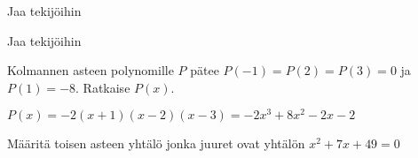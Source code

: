 \begin{tehtavasivu}
\begin{tehtava}
Jaa tekijöihin
\begin{alakohdat}
\end{alakohdat}
\begin{vastaus}
\begin{alakohdat}
\end{alakohdat}
\end{vastaus}
\end{tehtava}

\begin{tehtava}
    Jaa tekijöihin
    \begin{alakohdat}
    \end{alakohdat}
    \begin{vastaus}
    	\begin{alakohdat}
        \end{alakohdat}
    \end{vastaus}
\end{tehtava}

\begin{tehtava}
    Kolmannen asteen polynomille $P$ pätee $P(-1)=P(2)=P(3)=0$ ja $P(1)=-8$. Ratkaise $P(x)$.
    \begin{vastaus}
        $P(x)=-2(x+1)(x-2)(x-3)=-2x^3+8x^2-2x-2$
    \end{vastaus}
\end{tehtava}

\begin{tehtava}
   Määritä toisen asteen yhtälö jonka juuret ovat yhtälön $ x^2+7x+49 =0 $ 
 \begin{alakohdat}
    \end{alakohdat}
    \begin{vastaus}
        \begin{alakohdat}
        \end{alakohdat}
    \end{vastaus}
\end{tehtava}

\end{tehtavasivu}
